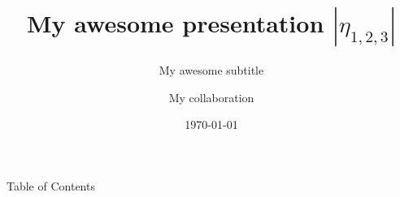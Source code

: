 \documentclass[10pt]{beamer}
\title{My awesome presentation $|\eta_{1,2,3}|$}
\subtitle{My awesome subtitle}
\author[My collaboration]{My collaboration}
\date{\today}
\begin{document}
\begin{frame}
  \titlepage
\end{frame}

\begin{frame}{Table of Contents}
    \begin{multicols}{2}
        \tableofcontents
    \end{multicols}
\end{frame}


\end{document}
